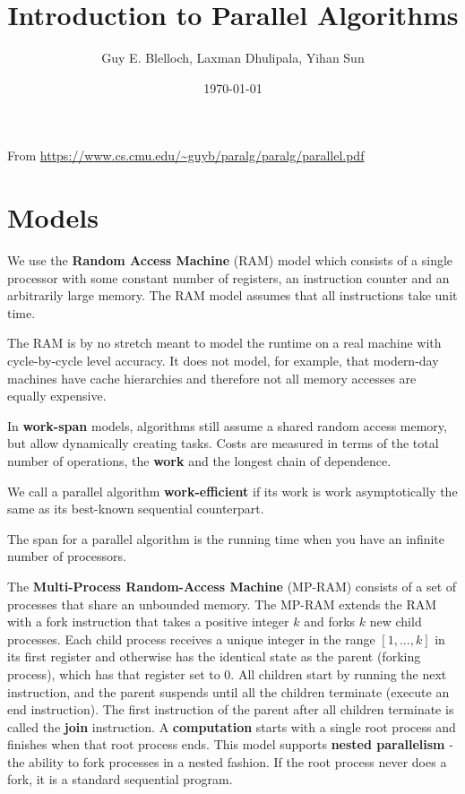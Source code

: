 \documentclass[11pt]{article}
\author{Guy E. Blelloch, Laxman Dhulipala, Yihan Sun}
\date{\today}
\title{Introduction to Parallel Algorithms}
\begin{document}
\maketitle
\tableofcontents

From \url{https://www.cs.cmu.edu/\~guyb/paralg/paralg/parallel.pdf}
\section{Models}
\label{sec:org1effaee}
We use the \textbf{Random Access Machine} (RAM) model which consists of a single processor with some constant
number of registers, an instruction counter and an arbitrarily large memory. The RAM model assumes
that all instructions take unit time.

The RAM is by no stretch meant to model the runtime on a real machine with cycle-by-cycle level
accuracy. It does not model, for example, that modern-day machines have cache hierarchies and
therefore not all memory accesses are equally expensive.

In \textbf{work-span} models, algorithms still assume a shared random access memory, but allow dynamically
creating tasks. Costs are measured in terms of the total number of operations, the \textbf{work} and the
longest chain of dependence.

We call a parallel algorithm \textbf{work-efficient} if its work is work asymptotically the same as its
best-known sequential counterpart.

The span for a parallel algorithm is the running time when you have an infinite number of processors.

The \textbf{Multi-Process Random-Access Machine} (MP-RAM) consists of a set of processes that share an
unbounded memory. The MP-RAM extends the RAM with a fork instruction that takes a positive integer
\(k\) and forks \(k\) new child processes. Each child process receives a unique integer in the range
\([1, . . . , k]\) in its first register and otherwise has the identical state as the parent (forking
process), which has that register set to 0. All children start by running the next instruction, and
the parent suspends until all the children terminate (execute an end instruction). The first
instruction of the parent after all children terminate is called the \textbf{join} instruction. A \textbf{computation}
starts with a single root process and finishes when that root process ends. This model supports
\textbf{nested parallelism} -the ability to fork processes in a nested fashion. If the root process never does
a fork, it is a standard sequential program.
\end{document}
